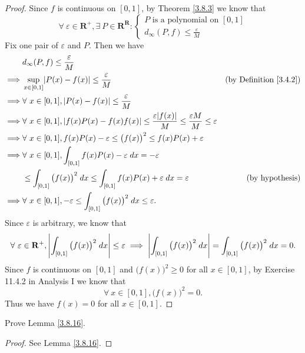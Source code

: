 \begin{proof}
    Since \(f\) is continuous on \([0, 1]\), by Theorem \ref{3.8.3} we know that
    \[
        \forall\ \varepsilon \in \mathbf{R}^+, \exists\ P \in \mathbf{R}^{\mathbf{R}} : \begin{cases}
            P \text{ is a polynomial on } [0, 1] \\
            d_{\infty}(P, f) \leq \frac{\varepsilon}{M}
        \end{cases}
    \]
    Fix one pair of \(\varepsilon\) and \(P\).
    Then we have
    \begin{align*}
                 & d_\infty(P, f) \leq \frac{\varepsilon}{M}                                                                                                                                     \\
        \implies & \sup_{x \in [0, 1]} \abs*{P(x) - f(x)} \leq \frac{\varepsilon}{M}                                                                        & \text{(by Definition \ref{3.4.2})} \\
        \implies & \forall\ x \in [0, 1], \abs*{P(x) - f(x)} \leq \frac{\varepsilon}{M}                                                                                                          \\
        \implies & \forall\ x \in [0, 1], \abs*{f(x) P(x) - f(x) f(x)} \leq \frac{\varepsilon \abs*{f(x)}}{M} \leq \frac{\varepsilon M}{M} \leq \varepsilon                                      \\
        \implies & \forall\ x \in [0, 1], f(x) P(x) - \varepsilon \leq \big(f(x)\big)^2 \leq f(x) P(x) + \varepsilon                                                                             \\
        \implies & \forall\ x \in [0, 1], \int_{[0, 1]} f(x) P(x) - \varepsilon \; dx = -\varepsilon                                                                                             \\
                 & \leq \int_{[0, 1]} \big(f(x)\big)^2 \; dx \leq \int_{[0, 1]} f(x) P(x) + \varepsilon \; dx = \varepsilon                                 & \text{(by hypothesis)}             \\
        \implies & \forall\ x \in [0, 1], -\varepsilon \leq \int_{[0, 1]} \big(f(x)\big)^2 \; dx \leq \varepsilon.
    \end{align*}
    Since \(\varepsilon\) is arbitrary, we know that
    \[
        \forall\ \varepsilon \in \mathbf{R}^+, \abs*{\int_{[0, 1]} \big(f(x)\big)^2 \; dx} \leq \varepsilon \implies \abs*{\int_{[0, 1]} \big(f(x)\big)^2 \; dx} = \int_{[0, 1]} \big(f(x)\big)^2 \; dx = 0.
    \]
    Since \(f\) is continuous on \([0, 1]\) and \(\big(f(x)\big)^2 \geq 0\) for all \(x \in [0, 1]\), by Exercise 11.4.2 in Analysis I we know that
    \[
        \forall\ x \in [0, 1], \big(f(x)\big)^2 = 0.
    \]
    Thus we have \(f(x) = 0\) for all \(x \in [0, 1]\).
\end{proof}

\begin{exercise}\label{ex 3.8.9}
    Prove Lemma \ref{3.8.16}.
\end{exercise}

\begin{proof}
    See Lemma \ref{3.8.16}.
\end{proof}
